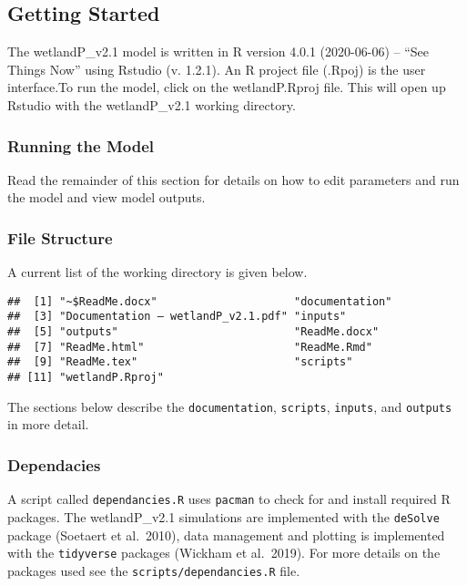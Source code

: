 \documentclass[
]{article}
\begin{document}
\hypertarget{getting-started}{%
\subsection{Getting Started}\label{getting-started}}

The wetlandP\_v2.1 model is written in R version 4.0.1 (2020-06-06) --
``See Things Now'' using Rstudio (v. 1.2.1). An R project file (.Rpoj)
is the user interface.To run the model, click on the wetlandP.Rproj
file. This will open up Rstudio with the wetlandP\_v2.1 working
directory.

\hypertarget{running-the-model}{%
\subsubsection{Running the Model}\label{running-the-model}}

Read the remainder of this section for details on how to edit parameters
and run the model and view model outputs.

\hypertarget{file-structure}{%
\subsubsection{File Structure}\label{file-structure}}

A current list of the working directory is given below.

\begin{verbatim}
##  [1] "~$ReadMe.docx"                     "documentation"                    
##  [3] "Documentation – wetlandP_v2.1.pdf" "inputs"                           
##  [5] "outputs"                           "ReadMe.docx"                      
##  [7] "ReadMe.html"                       "ReadMe.Rmd"                       
##  [9] "ReadMe.tex"                        "scripts"                          
## [11] "wetlandP.Rproj"
\end{verbatim}

The sections below describe the \texttt{documentation},
\texttt{scripts}, \texttt{inputs}, and \texttt{outputs} in more detail.

\hypertarget{dependacies}{%
\subsubsection{Dependacies}\label{dependacies}}

A script called \texttt{dependancies.R} uses \texttt{pacman} to check
for and install required R packages. The wetlandP\_v2.1 simulations are
implemented with the \texttt{deSolve} package (Soetaert et al.~2010),
data management and plotting is implemented with the \texttt{tidyverse}
packages (Wickham et al.~2019). For more details on the packages used
see the \texttt{scripts/dependancies.R} file.
\end{document}
